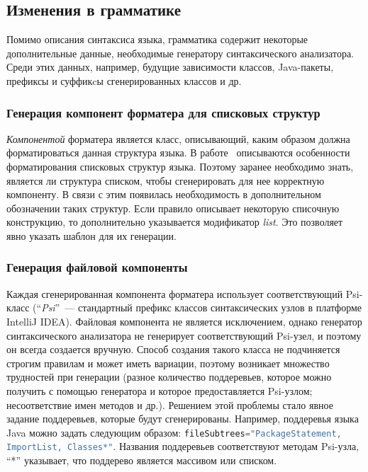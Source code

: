 \documentclass[conference]{IEEEtran}
\begin{document}
\subsection{Изменения в грамматике}
Помимо описания синтаксиса языка, грамматика содержит некоторые дополнительные данные, необходимые генератору синтаксического анализатора.
Среди этих данных, например, будущие зависимости классов, Java-пакеты, префиксы и суффикcы сгенерированных классов и др.

\subsubsection*{Генерация компонент форматера для списковых структур}
\emph{Компонентой} форматера является класс, описывающий, каким образом должна форматироваться данная структура языка.
В работе~\cite{while} описываются особенности форматирования списковых структур языка.
Поэтому заранее необходимо знать, является ли структура списком, чтобы сгенерировать для нее корректную компоненту.
В связи с этим появилась необходимость в дополнительном обозначении таких структур.
Если правило описывает некоторую списочную конструкцию, то дополнительно указывается модификатор \emph{list}.
Это позволяет явно указать шаблон для их генерации.

\subsubsection*{Генерация файловой компоненты}
Каждая сгенерированная компонента форматера использует соответствующий Psi-класс (``\emph{Psi}''~--- стандартный префикс классов синтаксических узлов в платформе IntelliJ IDEA).
Файловая компонента не является исключением, однако генератор синтаксического анализатора не генерирует соответствующий Psi-узел, и поэтому он всегда создается вручную.
Способ создания такого класса не подчиняется строгим правилам и может иметь вариации, поэтому возникает множество трудностей при генерации (разное количество поддеревьев, которое можно получить с помощью генератора и которое предоставляется Psi-узлом; несоответствие имен методов и др.).
Решением этой проблемы стало явное задание поддеревьев, которые будут сгенерированы.
Например, поддеревья языка Java можно задать следующим образом: \lstinline[language=java]{fileSubtrees="PackageStatement, ImportList, Classes*"}.
Названия поддеревьев соответствуют методам Psi-узла, ``*'' указывает, что поддерево является массивом или списком.
\end{document}

